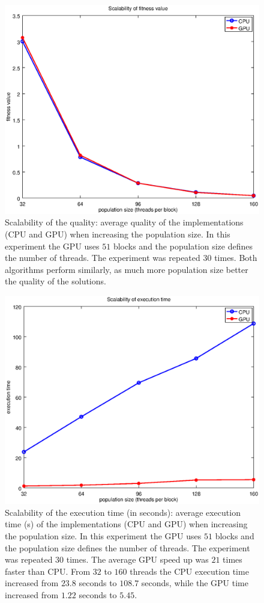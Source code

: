 \documentclass{article}
\begin{document}
    \begin{figure}[!htb]
        \centering
        \includegraphics[width=.7\textwidth]{../img/scalability_schafferf7.eps}
        \caption{Scalability of the quality: average quality of the implementations (CPU and GPU) when increasing the population size. In this experiment the GPU uses $51$ blocks and the population size defines the number of threads. The experiment was repeated $30$ times. Both algorithms perform similarly, as much more population size better the quality of the solutions.}
        \label{fig:scalability_schafferf7}
    \end{figure}


    \begin{figure}[!htb]
        \centering
        \includegraphics[width=.7\textwidth]{../img/scalability_schafferf7_time.eps}
        \caption{Scalability of the execution time (in seconds): average execution time (s) of the implementations (CPU and GPU) when increasing the population size. In this experiment the GPU uses $51$ blocks and the population size defines the number of threads. The experiment was repeated $30$ times. The average GPU speed up was $21$ times faster than CPU. From $32$ to $160$  threads the CPU execution time increased from $23.8$ seconds to $108.7$ seconds, while the GPU time increased from $1.22$ seconds to $5.45$.}
        \label{fig:scalability_schafferf7_time}
    \end{figure}
\end{document}
